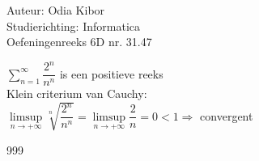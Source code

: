 \documentclass[a4paper]{article}
\begin{document}
  
\noindent \large Auteur: Odia Kibor \\
\noindent \large Studierichting: Informatica\\
\noindent \large Oefeningenreeks 6D nr. 31.47
\\

\medskip

\normalsize


$\displaystyle\sum\limits_{n = 1}^\infty\dfrac{2^n}{n^n}$ is een positieve reeks \\

Klein criterium van Cauchy: \\

$\displaystyle\limsup\limits_{n \to +\infty}\sqrt[n]{\dfrac{2^n}{n^n}} = \limsup\limits_{n \to +\infty}\dfrac{2}{n} = 0 < 1 \Rightarrow$ convergent \\




















\begin{thebibliography}{999}
\end{thebibliography}
\end{document}
